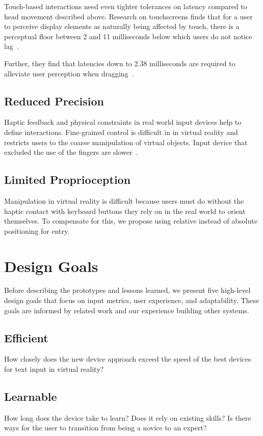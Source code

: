 \documentclass{sigchi}
\begin{document}
Touch-based interactions need even tighter tolerances on latency compared to head movement described above.
Research on touchscreens finds that for a user to perceive display elements as naturally being affected by touch, there is a perceptual floor between 2  and 11 milliseconds below which users do not notice lag~\cite{Jota:2013:FFE:2470654.2481317,Ng:2012:DLD:2380116.2380174}.

Further, they find that latencies down to 2.38 milliseconds are required to alleviate user perception when dragging~\cite{Jota:2013:FFE:2470654.2481317,Ng:2012:DLD:2380116.2380174}.

\subsection{Reduced Precision}
Haptic feedback and physical constraints in real world input devices help to define interactions. 
Fine-grained control is difficult in in virtual reality and restricts users to the coarse manipulation of virtual objects.
Input device that excluded the use of the fingers are slower~\cite{Zhai:1996:IMG:238386.238534}.

\subsection{Limited Proprioception}
Manipulation in virtual reality is difficult because users must do without the haptic contact with keyboard buttons they rely on in the real world to orient themselves.
To compensate for this, we propose using relative instead of absolute positioning for entry.


\section{Design Goals}
Before describing the prototypes and lessons learned, we present five high-level design goals that focus on input metrics, user experience, and adaptability.
These goals are informed by related work and our experience building other systems.

\subsection{Efficient}
How closely does the new device approach exceed the speed of the best devices for text input in virtual reality?

\subsection{Learnable}
How long does the device take to learn?
Does it rely on existing skills?
Is there ways for the user to transition from being a novice to an expert?
\end{document}

